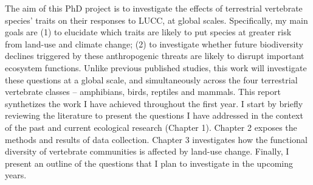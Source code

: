 The aim of this PhD project is to investigate the effects of terrestrial vertebrate species’ traits on their responses to LUCC, at global scales. Specifically, my main goals are (1) to elucidate which traits are likely to put species at greater risk from land-use and climate change; (2) to investigate whether future biodiversity declines triggered by these anthropogenic threats are likely to disrupt important ecosystem functions. Unlike previous published studies, this work will investigate these questions at a global scale, and simultaneously across the four terrestrial vertebrate classes – amphibians, birds, reptiles and mammals. 
This report synthetizes the work I have achieved throughout the first year. I start by briefly reviewing the literature to present the questions I have addressed in the context of the past and current ecological research (Chapter 1). Chapter 2 exposes the methods and results of data collection. Chapter 3 investigates how the functional diversity of vertebrate communities is affected by land-use change. Finally, I present an outline of the questions that I plan to investigate in the upcoming years.
